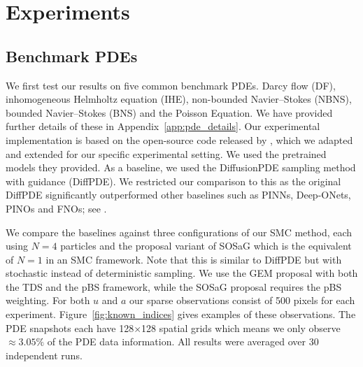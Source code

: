 \section{Experiments}

\subsection{Benchmark PDEs}
We first test our results on five common benchmark PDEs. Darcy flow (DF), inhomogeneous Helmholtz equation (IHE), non-bounded Navier--Stokes (NBNS), bounded Navier--Stokes (BNS) and the Poisson Equation. We have provided further details of these in Appendix~\ref{app:pde_details}. Our experimental implementation is based on the open-source code released by \citet{huang2024diffusionpdegenerativepdesolvingpartial}, which we adapted and extended for our specific experimental setting. We used the pretrained models they provided. As a baseline, we used the DiffusionPDE sampling method \citep{huang2024diffusionpdegenerativepdesolvingpartial} with guidance (DiffPDE). We restricted our comparison to this as the original DiffPDE significantly outperformed other baselines such as PINNs, Deep-ONets, PINOs and FNOs; 
see \citet[][Section 4]{huang2024diffusionpdegenerativepdesolvingpartial}. 

We compare the baselines against three configurations of our SMC method, each using $N=4$ particles and the proposal variant of SOSaG which is the equivalent of $N=1$ in an SMC framework. Note that this is similar to DiffPDE but with stochastic instead of deterministic sampling. We use the GEM proposal with both the TDS and the pBS framework, while the SOSaG proposal requires the pBS weighting. For both $u$ and $a$ our sparse observations consist of 500 pixels for each experiment. Figure~\ref{fig:known_indices} gives examples of these observations. The PDE snapshots each have 128$\times$128 spatial grids which means we only observe $\approx 3.05\%$ of the PDE data information. All results were averaged over 30 independent runs. 

